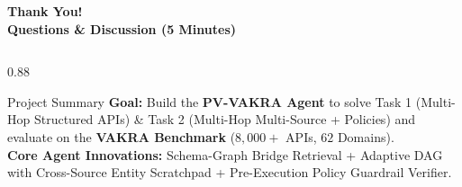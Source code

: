 \documentclass[aspectratio=169, 10pt]{beamer}
\begin{document}
\begin{frame}
\centering
\vspace{0.8cm}
{\Huge \textbf{Thank You!}}\\[0.4cm]
{\Large \textcolor{navyblue}{\textbf{Questions \& Discussion (5 Minutes)}}}\\[0.8cm]

\begin{columns}[T, onlytextwidth]
\begin{column}{0.88\textwidth}
\centering
\begin{block}{\centering Project Summary}
\footnotesize
\textbf{Goal:} Build the \textbf{PV-VAKRA Agent} to solve Task 1 (Multi-Hop Structured APIs) \& Task 2 (Multi-Hop Multi-Source + Policies) and evaluate on the \textbf{VAKRA Benchmark} ($8,000+$ APIs, $62$ Domains).\\
\textbf{Core Agent Innovations:} Schema-Graph Bridge Retrieval + Adaptive DAG with Cross-Source Entity Scratchpad + Pre-Execution Policy Guardrail Verifier.
\end{block}
\end{column}
\end{columns}
\end{frame}
\end{document}
